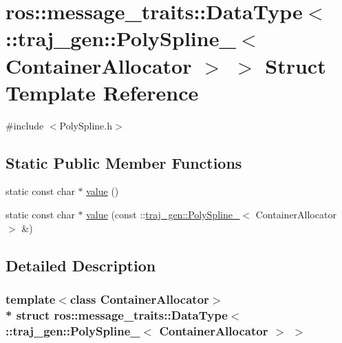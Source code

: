 \hypertarget{structros_1_1message__traits_1_1_data_type_3_01_1_1traj__gen_1_1_poly_spline___3_01_container_allocator_01_4_01_4}{}\section{ros\+:\+:message\+\_\+traits\+:\+:Data\+Type$<$ \+:\+:traj\+\_\+gen\+:\+:Poly\+Spline\+\_\+$<$ Container\+Allocator $>$ $>$ Struct Template Reference}
\label{structros_1_1message__traits_1_1_data_type_3_01_1_1traj__gen_1_1_poly_spline___3_01_container_allocator_01_4_01_4}


{\ttfamily \#include $<$Poly\+Spline.\+h$>$}

\subsection*{Static Public Member Functions}
\begin{DoxyCompactItemize}
\item 
static const char $\ast$ \hyperlink{structros_1_1message__traits_1_1_data_type_3_01_1_1traj__gen_1_1_poly_spline___3_01_container_allocator_01_4_01_4_abf220744a93c13e24c48a5ab57ef9fe6}{value} ()
\item 
static const char $\ast$ \hyperlink{structros_1_1message__traits_1_1_data_type_3_01_1_1traj__gen_1_1_poly_spline___3_01_container_allocator_01_4_01_4_a863abb98380ce9000983ca441a37a7b8}{value} (const \+::\hyperlink{structtraj__gen_1_1_poly_spline__}{traj\+\_\+gen\+::\+Poly\+Spline\+\_\+}$<$ Container\+Allocator $>$ \&)
\end{DoxyCompactItemize}


\subsection{Detailed Description}
\subsubsection*{template$<$class Container\+Allocator$>$\\*
struct ros\+::message\+\_\+traits\+::\+Data\+Type$<$ \+::traj\+\_\+gen\+::\+Poly\+Spline\+\_\+$<$ Container\+Allocator $>$ $>$}



